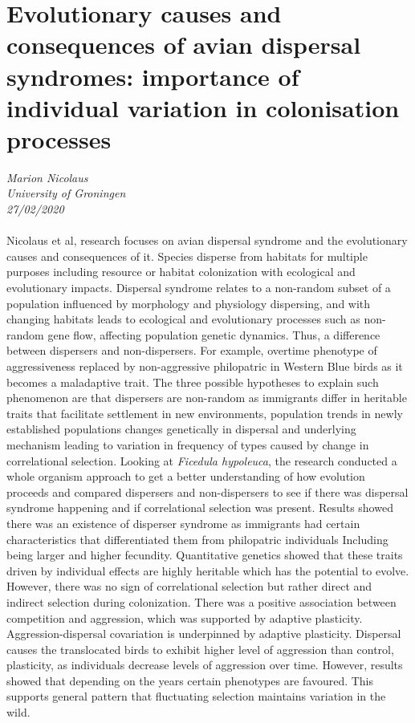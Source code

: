\documentclass[11pt]{article}
\begin{document}
\section{Evolutionary causes and consequences of avian dispersal syndromes: importance of individual variation in colonisation processes}
\textit{Marion Nicolaus\\University of Groningen\\27/02/2020}
\\
\\Nicolaus et al, research focuses on avian dispersal syndrome and the evolutionary causes and consequences of it. Species disperse from habitats for multiple purposes including resource or habitat colonization with ecological and evolutionary impacts. Dispersal syndrome relates to a non-random subset of a population influenced by morphology and physiology dispersing, and with changing habitats leads to ecological and evolutionary processes such as non-random gene flow, affecting population genetic dynamics. Thus, a difference between dispersers and non-dispersers. For example, overtime phenotype of aggressiveness replaced by non-aggressive philopatric in Western Blue birds as it becomes a maladaptive trait. The three possible hypotheses to explain such phenomenon are that dispersers are non-random as immigrants differ in heritable traits that facilitate settlement in new environments, population trends in newly established populations changes genetically in dispersal and underlying mechanism leading to variation in frequency of types caused by change in correlational selection. Looking at \textit{Ficedula hypoleuca}, the research conducted a whole organism approach to get a better understanding of how evolution proceeds and compared dispersers and non-dispersers to see if there was dispersal syndrome happening and if correlational selection was present. Results showed there was an existence of disperser syndrome as immigrants had certain characteristics that differentiated them from philopatric individuals Including being larger and higher fecundity. Quantitative genetics showed that these traits driven by individual effects are highly heritable which has the potential to evolve. However, there was no sign of correlational selection but rather direct and indirect selection during colonization. There was a positive association between competition and aggression, which was supported by adaptive plasticity. Aggression-dispersal covariation is underpinned by adaptive plasticity. Dispersal causes the translocated birds to exhibit higher level of aggression than control, plasticity, as individuals decrease levels of aggression over time. However, results showed that depending on the years certain phenotypes are favoured. This supports general pattern that fluctuating selection maintains variation in the wild.
\end{document}
